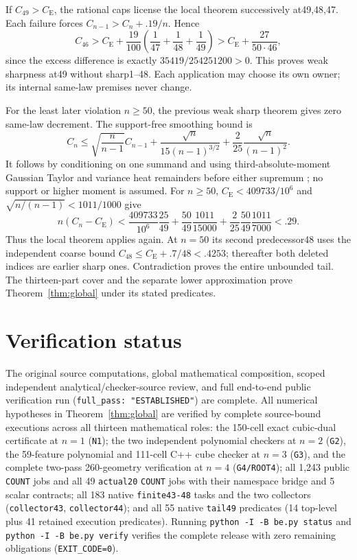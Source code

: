 \documentclass[11pt,a4paper]{article}
\newcommand{\CE}{C_{\mathrm E}}
\begin{document}
If $C_{49}>\CE$, the rational caps license the local theorem successively
at49,48,47. Each failure forces $C_{n-1}>C_n+.19/n$. Hence
\[
 C_{46}>\CE+\frac{19}{100}\left(\frac1{47}+\frac1{48}+\frac1{49}\right)
 >\CE+\frac{27}{50\cdot46},
\]
since the excess difference is exactly $35419/254251200>0$.
This proves weak sharpness at49 without sharp1--48. Each application may
choose its own owner; its internal same-law premises never change.

For the least later violation $n\ge50$, the previous weak sharp theorem
gives zero same-law decrement. The support-free smoothing bound is
\[
 C_n\le\sqrt{\frac n{n-1}}C_{n-1}
 +\frac{\sqrt n}{15(n-1)^{3/2}}+\frac2{25}\frac{\sqrt n}{(n-1)^2}.
\]
It follows by conditioning on one summand and using third-absolute-moment
Gaussian Taylor and variance heat remainders before either supremum
\cite[lines7463--7506]{source}; no support or higher moment is assumed.
For $n\ge50$, $\CE<409733/10^6$ and $\sqrt{n/(n-1)}<1011/1000$ give
\[
 n(C_n-\CE)<\frac{409733}{10^6}\frac{25}{49}
 +\frac{50}{49}\frac{1011}{15000}
 +\frac2{25}\frac{50}{49}\frac{1011}{7000}<.29.
\]
Thus the local theorem applies again. At $n=50$ its second predecessor48
uses the independent coarse bound $C_{48}\le\CE+.7/48<.4253$; thereafter
both deleted indices are earlier sharp ones. Contradiction proves the
entire unbounded tail. The thirteen-part cover and the separate lower
approximation prove Theorem~\ref{thm:global} under its stated predicates.

\section{Verification status}\label{sec:open}
The original source computations, global mathematical composition, scoped
independent analytical/checker-source review, and full end-to-end public
verification run (\texttt{full\_pass: "ESTABLISHED"}) are complete. All
numerical hypotheses in Theorem~\ref{thm:global} are verified by complete
source-bound executions across all thirteen mathematical roles: the 150-cell
exact cubic-dual certificate at $n=1$ (\texttt{N1}); the two independent
polynomial checkers at $n=2$ (\texttt{G2}), the 59-feature polynomial and
111-cell C++ cube checker at $n=3$ (\texttt{G3}), and the complete two-pass
260-geometry verification at $n=4$ (\texttt{G4/ROOT4}); all 1,243 public
\texttt{COUNT} jobs and all 49 \texttt{actual20} \texttt{COUNT} jobs with their
namespace bridge and 5 scalar contracts; all 183 native \texttt{finite43-48}
tasks and the two collectors (\texttt{collector43}, \texttt{collector44}); and
all 55 native \texttt{tail49} predicates (14 top-level plus 41 retained
execution predicates). Running \texttt{python -I -B be.py status} and
\texttt{python -I -B be.py verify} verifies the complete release with zero
remaining obligations (\texttt{EXIT\_CODE=0}).
\end{document}
